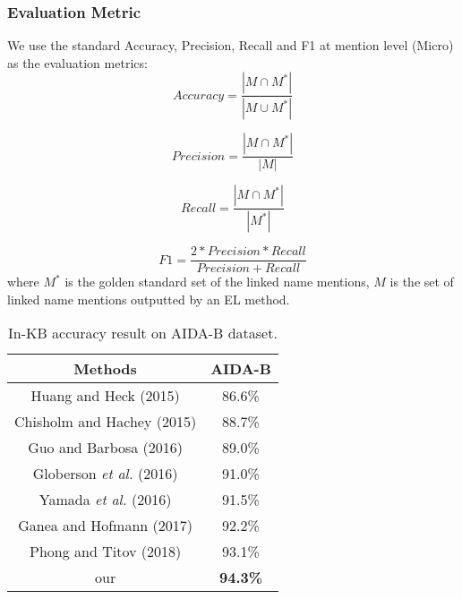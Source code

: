 \documentclass[sigconf]{acmart}
\begin{document}
\subsubsection*{Evaluation Metric}
We use the standard Accuracy, Precision, Recall and F1 at mention level (Micro) as the evaluation metrics:
\begin{equation}
Accuracy = \frac{|M \cap M^*|}{|M \cup M^*|}
\end{equation}

\begin{equation}
Precision = \frac{|M \cap M^*|}{|M|}
\end{equation}

\begin{equation}
Recall = \frac{|M \cap M^*|}{|M^*|}
\end{equation}

\begin{equation}
F1 = \frac{2*Precision*Recall}{Precision+Recall}
\end{equation}
where $M^*$ is the golden standard set of the linked name mentions, $M$ is the set of linked name mentions outputted by an EL method.


\begin{table}[tp]
\caption{In-KB accuracy result on AIDA-B dataset.}
\renewcommand\arraystretch{1}
\newcommand{\tabincell}[2]{\begin{tabular}{@{}#1@{}}#2\end{tabular}}
\centering
\begin{tabular}{|c|c|} 
\hline  
{Methods}  & {AIDA-B} \\
\hline  
Huang and Heck (2015)\cite{HuangHJ15}  & 86.6\%  \\
\hline  
Chisholm and Hachey (2015)\cite{ChisholmH15}  & 88.7\%  \\
\hline 
Guo and Barbosa (2016)\cite{GuoB18}  & 89.0\%  \\
\hline 
Globerson \emph{et al.} (2016)\cite{GlobersonLCSRP16}  & 91.0\%  \\
\hline 
Yamada \emph{et al.} (2016)\cite{YamadaS0T16}  & 91.5\%  \\
\hline 
Ganea and Hofmann (2017)\cite{GaneaH17}  & 92.2\%  \\
\hline 
Phong and Titov (2018)\cite{TitovL18a}  & 93.1\%  \\
\hline
our  & {\bfseries 94.3\%}  \\
\hline  
\end{tabular}
\setlength{\abovecaptionskip}{8pt}
\end{table}
\end{document}
